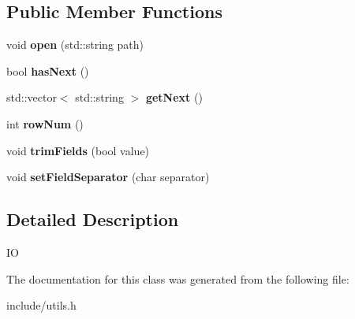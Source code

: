 \subsection*{Public Member Functions}
\begin{DoxyCompactItemize}
\item 
\hypertarget{class_c_s_v_reader_a26227ceca9cb3e5f761788e9934d4920}{void {\bfseries open} (std\+::string path)}\label{class_c_s_v_reader_a26227ceca9cb3e5f761788e9934d4920}

\item 
\hypertarget{class_c_s_v_reader_ae411eb74d89935e02287c499b28a36d6}{bool {\bfseries has\+Next} ()}\label{class_c_s_v_reader_ae411eb74d89935e02287c499b28a36d6}

\item 
\hypertarget{class_c_s_v_reader_a66d28a3bf8a3e4ef8a4c5f3fb2a238e8}{std\+::vector$<$ std\+::string $>$ {\bfseries get\+Next} ()}\label{class_c_s_v_reader_a66d28a3bf8a3e4ef8a4c5f3fb2a238e8}

\item 
\hypertarget{class_c_s_v_reader_a5a3d027966cb33b36c80070f6896c5ab}{int {\bfseries row\+Num} ()}\label{class_c_s_v_reader_a5a3d027966cb33b36c80070f6896c5ab}

\item 
\hypertarget{class_c_s_v_reader_aabd4741cea3e248340fe6a76f4ddd421}{void {\bfseries trim\+Fields} (bool value)}\label{class_c_s_v_reader_aabd4741cea3e248340fe6a76f4ddd421}

\item 
\hypertarget{class_c_s_v_reader_ae781c05f137c1745abbf03a7fe09d59a}{void {\bfseries set\+Field\+Separator} (char separator)}\label{class_c_s_v_reader_ae781c05f137c1745abbf03a7fe09d59a}

\end{DoxyCompactItemize}


\subsection{Detailed Description}
I\+O 

The documentation for this class was generated from the following file\+:\begin{DoxyCompactItemize}
\item 
include/utils.\+h\end{DoxyCompactItemize}
